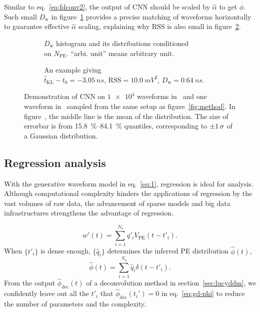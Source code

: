 Similar to eq.~\eqref{eq:fdconv2}, the output of CNN should be scaled by $\hat{\alpha}$ to get $\hat{\phi}$. Such small $D_\mathrm{w}$ in figure~\ref{fig:cnn-npe} provides a precise matching of waveforms horizontally to guarantee effective $\hat{\alpha}$ scaling, explaining why $\mathrm{RSS}$ is also small in figure~\ref{fig:cnn}.

\begin{figure}[H]
  \begin{subfigure}{.5\textwidth}
    \centering
    \resizebox{\textwidth}{!}{}
    \caption{\label{fig:cnn-npe} $D_\mathrm{w}$ histogram and its distributions conditioned \\ on $N_{\mathrm{PE}}$. ``arbi. unit'' means arbitrary unit.}
  \end{subfigure}
  \begin{subfigure}{.5\textwidth}
    \centering
    \resizebox{\textwidth}{!}{}
    \caption{\label{fig:cnn}An example giving \\ $\hat{t}_\mathrm{KL} - t_0=\SI{-3.05}{ns}$, $\mathrm{RSS}=\SI{10.0}{mV^2}$, $D_\mathrm{w}=\SI{0.64}{ns}$.}
  \end{subfigure}
  \caption{\label{fig:cnn-performance}Demonstration of CNN on $\num[retain-unity-mantissa=false]{1e4}$ waveforms in~ and one waveform in~ sampled from the same setup as figure~\ref{fig:method}. In figure~, the middle line is the mean of the distribution. The size of errorbar is from \SIrange{15.8}{84.1}{\percent} quantiles, corresponding to $\SI{\pm 1}{\sigma}$ of a Gaussian distribution. }
\end{figure}

\subsection{Regression analysis}
\label{sec:regression}
With the generative waveform model in eq.~\eqref{eq:1}, regression is ideal for analysis. Although computational complexity hinders the applications of regression by the vast volumes of raw data, the advancement of sparse models and big data infrastructures strengthens the advantage of regression.

\begin{equation}
  \label{eq:gd}
  w'(t) = \sum_{i=1}^{N_\mathrm{s}}q'_iV_\mathrm{PE}(t-t'_i).
\end{equation}
When $\{t'_i\}$ is dense enough, $\{\hat{q}_i\}$ determines the inferred PE distribution $\hat{\phi}(t)$,
\begin{equation}
  \label{eq:gd-phi}
  \hat{\phi}(t) = \sum_{i=1}^{N_\mathrm{s}}\hat{q}_i\delta(t-t'_i).
\end{equation}
From the output $\hat{\phi}_\mathrm{dec}(t)$ of a deconvolution method in section~\ref{sec:lucyddm}, we confidently leave out all the $t'_i$ that $\hat{\phi}_\mathrm{dec}(t_i')=0$ in eq.~\eqref{eq:gd-phi} to reduce the number of parameters and the complexity.


